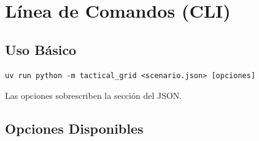 \chapter{Línea de Comandos (CLI)}
\label{man:cli}

\section{Uso Básico}
\label{sec:cli-basico}

\begin{verbatim}
uv run python -m tactical_grid <scenario.json> [opciones]
\end{verbatim}

Las opciones sobrescriben la sección  del JSON.


\section{Opciones Disponibles}
\label{sec:cli-opciones}

